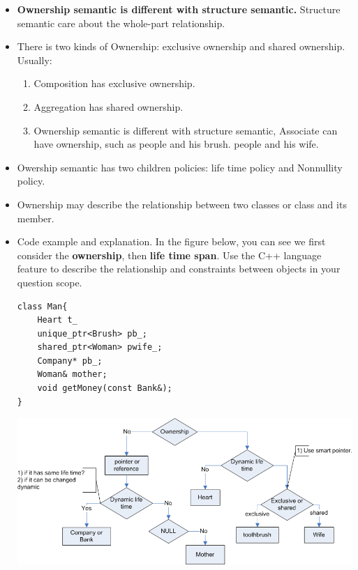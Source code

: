 \documentclass[a4paper,11pt,twoside]{book}
\begin{document}
\begin{itemize}
	\item \textbf{Ownership semantic is different with structure semantic.} Structure semantic care about the whole-part relationship.
	
	\item There is two kinds of Ownership: exclusive ownership and shared ownership. Usually:
	\begin{enumerate}
		\item Composition has exclusive ownership.
		\item Aggregation has shared ownership.
		\item Ownership semantic is different with structure semantic, Associate can have ownership, such as people and his brush. people and his wife.
	\end{enumerate}
	
	\item Owership semantic has two children policies: life time policy and Nonnullity policy. 
	
	\item Ownership may describe the relationship between two classes or class and its member.
	
	\item Code example and explanation. In the figure below, you can see we first consider the \textbf{ownership}, then \textbf{life time span}. Use the C++ language feature to describe the relationship and constraints between objects in your question scope. 
	
\begin{lstlisting}
class Man{
	Heart t_   
	unique_ptr<Brush> pb_; 
	shared_ptr<Woman> pwife_; 
	Company* pb_; 
	Woman& mother; 
	void getMoney(const Bank&);
}
\end{lstlisting}


\begin{center}
		\includegraphics[width=0.92\linewidth]{pics/owner.png}
\end{center}



\end{itemize}
\end{document}
